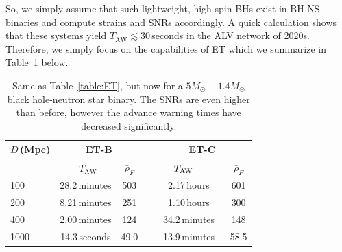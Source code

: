 \documentclass[prd,amsmath,amssymb,aps,floats,amsfonts,notitlepage,superscriptaddress,eqsecnum,nofootinbib,10pt]{revtex4-1}
\newcommand\T{\rule{0pt}{2.6ex}}       %
\newcommand\B{\rule[-1.2ex]{0pt}{0pt}} %
\begin{document}
So, we simply assume that such lightweight, high-spin BHs exist in BH-NS binaries and compute strains and SNRs accordingly.
A quick calculation shows that these systems yield $T_\text{AW} \lesssim 30\,$seconds in the ALV network of 2020s. %
Therefore, we simply focus on the capabilities of ET which we summarize in Table~\ref{table:ET_BH_NS} below.
%
%
%
\begin{table}[h]
\centering
\begin{tabular}{lccccc}
\hline\hline
$D\,$(Mpc) & \multicolumn{2}{c}{ET-B} &  & \multicolumn{2}{c}{ET-C}\T\B\\
\hline
{}&  \ \hspace{6mm}$T_\text{AW}$ \hspace{8mm} & $\bar{\rho}_{F}$ &{}  & $\hspace{6mm}T_\text{AW} \hspace{10mm}$ & $\bar{\rho}_{F}$\T\B\\

100 &   28.2\,minutes & 503 &{\qquad} &  2.17\,hours & 601\T\\
200 & 8.21\,minutes & 251  &{\qquad} & 1.10\,hours & 300 \\
400 &  2.00\,minutes & 124 &{\qquad} & 34.2\,minutes & 148\\
1000 & 14.3\,seconds & 49.0 &{\qquad} & 13.9\,minutes& 58.5\\
\hline\hline
\end{tabular}
\caption{Same as Table~\ref{table:ET}, but now for a $5 M_\odot- 1.4 M_\odot$ black hole-neutron star binary.
The SNRs are even higher than before, however the advance warning times have decreased significantly.}\label{table:ET_BH_NS}
\end{table}
%
%
\end{document}

